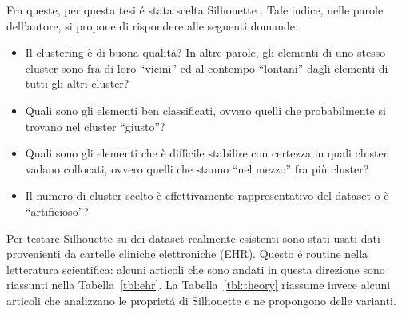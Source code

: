 \documentclass[a4paper, 12pt]{report}
\begin{document}
		Fra queste, per questa tesi é stata scelta Silhouette
		\cite{ROUSSEEUW198753}. Tale indice, nelle parole
		dell'autore, si propone di rispondere alle seguenti
		domande:

		\begin{itemize}
			\item
			Il clustering è di buona qualità? In altre parole, gli elementi di
			uno stesso cluster sono fra di loro ``vicini'' ed al contempo ``lontani''
			dagli elementi di tutti gli altri cluster?
			\item
			Quali sono gli elementi ben classificati, ovvero quelli che probabilmente
			si trovano nel cluster ``giusto''?
			\item
			Quali sono gli elementi che è difficile stabilire con certezza in quali
			cluster vadano collocati, ovvero quelli che stanno ``nel mezzo'' fra più
			cluster?
			\item
			Il numero di cluster scelto è effettivamente rappresentativo del dataset
			o è ``artificioso''?
		\end{itemize}

		Per testare Silhouette su dei dataset realmente esistenti sono
		stati usati dati provenienti da cartelle cliniche elettroniche
		(EHR). Questo é routine nella letteratura scientifica: alcuni
		articoli che sono andati in questa direzione sono riassunti
		nella Tabella~\ref{tbl:ehr}. La Tabella~\ref{tbl:theory} riassume
		invece alcuni articoli che analizzano le proprietá di Silhouette
		e ne propongono delle varianti.
\end{document}
